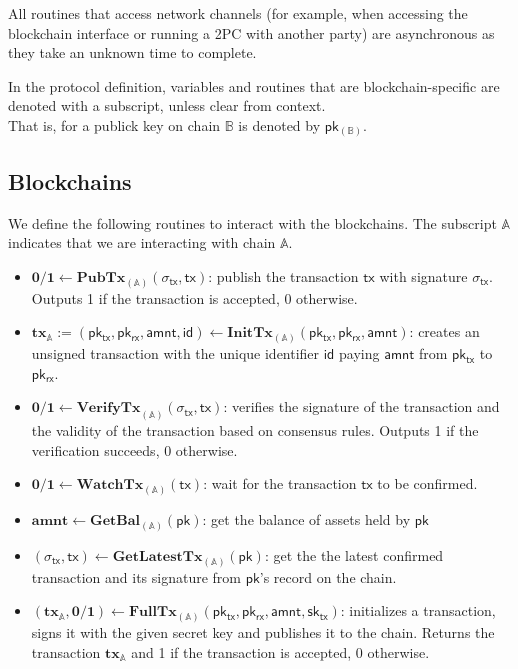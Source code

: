 \documentclass{article}      	%
\begin{document}
All routines that access network channels (for example, when accessing the blockchain interface or running a 2PC with another party) are asynchronous as they take an unknown time to complete.

In the protocol definition, variables and routines that are blockchain-specific are denoted with a subscript, unless clear from context. \\
That is, for a publick key on chain $\mathbb{B}$ is denoted by $\mathsf{pk_{(\mathbb{B})}}$. \\

\subsection{Blockchains}

We define the following routines to interact with the blockchains. The subscript $\mathbb{A}$ indicates that we are interacting with chain $\mathbb{A}$.

\begin{itemize}[topsep=0pt, itemsep=0pt, leftmargin=2em]
    \item $\mathbf{0/1} \gets \mathbf{PubTx}_{(\mathbb{A})}(\sigma_{\mathsf{tx}}, \mathsf{tx})$: publish the transaction $\mathsf{tx}$ with signature $\sigma_{\mathsf{tx}}$. Outputs 1 if the transaction is accepted, 0 otherwise.
    \item $\mathbf{tx}_{\mathbb{A}} := (\mathsf{pk_{tx}}, \mathsf{pk_{rx}}, \mathsf{amnt}, \mathsf{id})  \gets \mathbf{InitTx}_{(\mathbb{A})}(\mathsf{pk_{tx}}, \mathsf{pk_{rx}}, \mathsf{amnt})$: creates an unsigned transaction with the unique identifier $\mathsf{id}$ paying $\mathsf{amnt}$ from $\mathsf{pk_{tx}}$ to $\mathsf{pk_{rx}}$.
    \item $\mathbf{0/1} \gets \mathbf{VerifyTx}_{(\mathbb{A})}(\sigma_{\mathsf{tx}}, \mathsf{tx})$: verifies the signature of the transaction and the validity of the transaction based on consensus rules. Outputs 1 if the verification succeeds, 0 otherwise.
    \item $\mathbf{0/1} \gets \mathbf{WatchTx}_{(\mathbb{A})}(\mathsf{tx})$: wait for the transaction $\mathsf{tx}$ to be confirmed.
    \item $\mathbf{amnt} \gets \mathbf{GetBal}_{(\mathbb{A})}(\mathsf{pk})$: get the balance of assets held by $\mathsf{pk}$
    \item $(\sigma_{\mathsf{tx}}, \mathsf{tx}) \gets \mathbf{GetLatestTx}_{(\mathbb{A})}(\mathsf{pk})$: get the the latest confirmed transaction and its signature from $\mathsf{pk}$'s record on the chain.
    \item $(\mathbf{tx}_{\mathbb{A}}, \mathbf{0/1})  \gets \mathbf{FullTx}_{(\mathbb{A})}(\mathsf{pk_{tx}}, \mathsf{pk_{rx}}, \mathsf{amnt}, \mathsf{sk_{tx}})$: initializes a transaction, signs it with the given secret key and publishes it to the chain. Returns the transaction $\mathbf{tx}_{\mathbb{A}}$ and 1 if the transaction is accepted, 0 otherwise.
\end{itemize}
\end{document}
